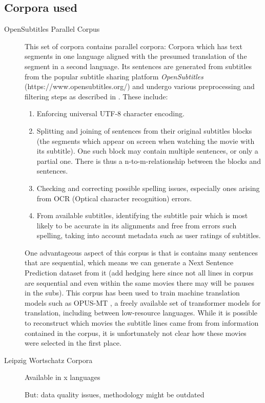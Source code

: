 \subsection{Corpora used}
\begin{description}
	\item[OpenSubtitles Parallel Corpus]
	      This set of corpora contains parallel corpora:
	      Corpora which has text segments in one language aligned with the presumed translation of the segment in a second language.
	      Its sentences are generated from subtitles from the popular subtitle sharing platform \textit{OpenSubtitles} (https://www.opensubtitles.org/) and undergo various preprocessing and filtering steps as described in \cite{lisonOpensubtitles2016ExtractingLarge2016}.
	      These include:
	      \begin{enumerate}
		      \item Enforcing universal UTF-8 character encoding.
		      \item
		            Splitting and joining of sentences from their original subtitles blocks (the segments which appear on screen when watching the movie with its subtitle).
		            One such block may contain multiple sentences, or only a partial one.
		            There is thus a n-to-m-relationship between the blocks and sentences.
		      \item Checking and correcting possible spelling issues, especially ones arising from OCR (Optical character recognition) errors.
		      \item From available subtitles, identifying the subtitle pair which is most likely to be accurate in its alignments and free from errors such spelling, taking into account metadata such as user ratings of subtitles.

	      \end{enumerate}
		  One advantageous aspect of this corpus is that is contains many sentences that are sequential, which means we can generate a Next Sentence Prediction dataset from it (add hedging here since not all lines in corpus are sequential and even within the same movies there may will be pauses in the subs).
		  This corpus has been used to train machine translation models such as OPUS-MT \cite{tiedemannOPUSMTbuildingOpenTranslation2020}, a freely available set of transformer models for translation, including between low-resource languages. 
		  While it is possible to reconstruct which movies the subtitle lines came from from information contained in the corpus, it is unfortunately not clear how these movies were selected in the first place.

	\item[Leipzig Wortschatz Corpora]
		Available in x languages

		But: data quality issues, methodology might be outdated

		\cite{goldhahnBuildingLargeMonolingual2012}

\end{description}


